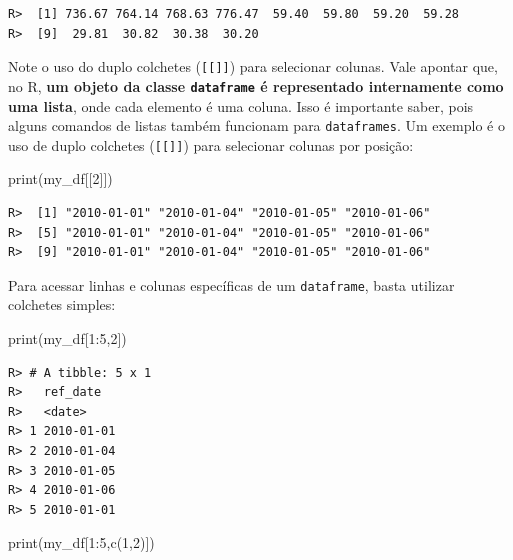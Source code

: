 \documentclass[
  11pt,
]{book}
\newenvironment{Shaded}{\begin{snugshade}}{\end{snugshade}}
\newcommand{\DecValTok}[1]{\textcolor[rgb]{0.06,0.06,0.06}{#1}}
\newcommand{\FunctionTok}[1]{\textcolor[rgb]{0,0,0}{#1}}
\newcommand{\NormalTok}[1]{#1}
\newcommand{\SpecialCharTok}[1]{\textcolor[rgb]{0,0,0}{#1}}
\begin{document}
\begin{verbatim}
R>  [1] 736.67 764.14 768.63 776.47  59.40  59.80  59.20  59.28
R>  [9]  29.81  30.82  30.38  30.20
\end{verbatim}

Note o uso do duplo colchetes (\texttt{{[}{[}{]}{]}}) para selecionar colunas. Vale apontar que, no R, \textbf{um objeto da classe \texttt{dataframe} é representado internamente como uma lista}, onde cada elemento é uma coluna. Isso é importante saber, pois alguns comandos de listas também funcionam para \texttt{dataframes}. Um exemplo é o uso de duplo colchetes (\texttt{{[}{[}{]}{]}}) para selecionar colunas por posição:

\begin{Shaded}
\begin{Highlighting}[]
\FunctionTok{print}\NormalTok{(my\_df[[}\DecValTok{2}\NormalTok{]])}
\end{Highlighting}
\end{Shaded}

\begin{verbatim}
R>  [1] "2010-01-01" "2010-01-04" "2010-01-05" "2010-01-06"
R>  [5] "2010-01-01" "2010-01-04" "2010-01-05" "2010-01-06"
R>  [9] "2010-01-01" "2010-01-04" "2010-01-05" "2010-01-06"
\end{verbatim}

Para acessar linhas e colunas específicas de um \texttt{dataframe}, basta utilizar colchetes simples:

\begin{Shaded}
\begin{Highlighting}[]
\FunctionTok{print}\NormalTok{(my\_df[}\DecValTok{1}\SpecialCharTok{:}\DecValTok{5}\NormalTok{,}\DecValTok{2}\NormalTok{])}
\end{Highlighting}
\end{Shaded}

\begin{verbatim}
R> # A tibble: 5 x 1
R>   ref_date  
R>   <date>    
R> 1 2010-01-01
R> 2 2010-01-04
R> 3 2010-01-05
R> 4 2010-01-06
R> 5 2010-01-01
\end{verbatim}

\begin{Shaded}
\begin{Highlighting}[]
\FunctionTok{print}\NormalTok{(my\_df[}\DecValTok{1}\SpecialCharTok{:}\DecValTok{5}\NormalTok{,}\FunctionTok{c}\NormalTok{(}\DecValTok{1}\NormalTok{,}\DecValTok{2}\NormalTok{)])}
\end{Highlighting}
\end{Shaded}
\end{document}
